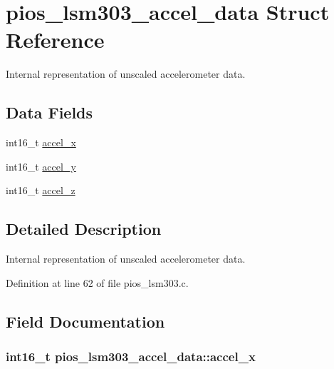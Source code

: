 \hypertarget{structpios__lsm303__accel__data}{\section{pios\-\_\-lsm303\-\_\-accel\-\_\-data \-Struct \-Reference}
\label{structpios__lsm303__accel__data}
}


\-Internal representation of unscaled accelerometer data.  


\subsection*{\-Data \-Fields}
\begin{DoxyCompactItemize}
\item 
int16\-\_\-t \hyperlink{structpios__lsm303__accel__data_aec4209992177ea4a76d150164ab90f9e}{accel\-\_\-x}
\item 
int16\-\_\-t \hyperlink{structpios__lsm303__accel__data_a7ffd1885ce614cf3163ee96ef56ace76}{accel\-\_\-y}
\item 
int16\-\_\-t \hyperlink{structpios__lsm303__accel__data_a426a988b03d546ea4036551041bf00d1}{accel\-\_\-z}
\end{DoxyCompactItemize}


\subsection{\-Detailed \-Description}
\-Internal representation of unscaled accelerometer data. 

\-Definition at line 62 of file pios\-\_\-lsm303.\-c.



\subsection{\-Field \-Documentation}
\hypertarget{structpios__lsm303__accel__data_aec4209992177ea4a76d150164ab90f9e}{
\subsubsection[{accel\-\_\-x}]{\setlength{\rightskip}{0pt plus 5cm}int16\-\_\-t {\bf pios\-\_\-lsm303\-\_\-accel\-\_\-data\-::accel\-\_\-x}}}\label{structpios__lsm303__accel__data_aec4209992177ea4a76d150164ab90f9e}


